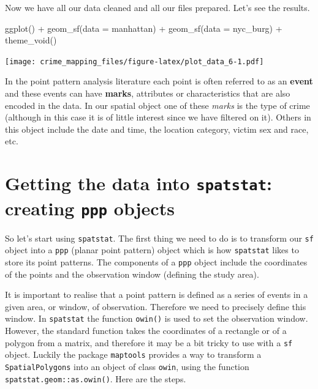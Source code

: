 \documentclass[
  krantz2]{krantz}
\makeatletter
\newenvironment{Shaded}{\begin{snugshade}}{\end{snugshade}}
\newcommand{\AttributeTok}[1]{\textcolor[rgb]{0.61,0.61,0.61}{#1}}
\newcommand{\FunctionTok}[1]{\textcolor[rgb]{0,0,0}{#1}}
\newcommand{\NormalTok}[1]{#1}
\newcommand{\SpecialCharTok}[1]{\textcolor[rgb]{0,0,0}{#1}}
\newenvironment{kframe}{%
\medskip{}
\setlength{\fboxsep}{.8em}
 \def\at@end@of@kframe{}%
 \ifinner\ifhmode%
  \def\at@end@of@kframe{\end{minipage}}%
  \begin{minipage}{\columnwidth}%
 \fi\fi%
 \def\FrameCommand##1{\hskip\@totalleftmargin \hskip-\fboxsep
 \colorbox{shadecolor}{##1}\hskip-\fboxsep
     \hskip-\linewidth \hskip-\@totalleftmargin \hskip\columnwidth}%
 \MakeFramed {\advance\hsize-\width
   \@totalleftmargin\z@ \linewidth\hsize
   \@setminipage}}%
 {\par\unskip\endMakeFramed%
 \at@end@of@kframe}
\renewenvironment{Shaded}{\begin{kframe}}{\end{kframe}}
\makeatother
\begin{document}
Now we have all our data cleaned and all our files prepared. Let's see the results.

\begin{Shaded}
\begin{Highlighting}[]
\FunctionTok{ggplot}\NormalTok{() }\SpecialCharTok{+} 
  \FunctionTok{geom\_sf}\NormalTok{(}\AttributeTok{data =}\NormalTok{ manhattan) }\SpecialCharTok{+} 
  \FunctionTok{geom\_sf}\NormalTok{(}\AttributeTok{data =}\NormalTok{ nyc\_burg) }\SpecialCharTok{+} 
  \FunctionTok{theme\_void}\NormalTok{()}
\end{Highlighting}
\end{Shaded}

\texttt{[image: crime\_mapping\_files/figure-latex/plot\_data\_6-1.pdf]}

In the point pattern analysis literature each point is often referred to as an \textbf{event} and these events can have \textbf{marks}, attributes or characteristics that are also encoded in the data. In our spatial object one of these \emph{marks} is the type of crime (although in this case it is of little interest since we have filtered on it). Others in this object include the date and time, the location category, victim sex and race, etc.

\hypertarget{getting-the-data-into-spatstat-creating-ppp-objects}{%
\section{\texorpdfstring{Getting the data into \texttt{spatstat}: creating \texttt{ppp} objects}{Getting the data into spatstat: creating ppp objects}}\label{getting-the-data-into-spatstat-creating-ppp-objects}}

So let's start using \texttt{spatstat}. The first thing we need to do is to transform our \texttt{sf} object into a \texttt{ppp} (planar point pattern) object which is how \texttt{spatstat} likes to store its point patterns. The components of a \texttt{ppp} object include the coordinates of the points and the observation window (defining the study area).

It is important to realise that a point pattern is defined as a series of events in a given area, or window, of observation. Therefore we need to precisely define this window. In \texttt{spatstat} the function \texttt{owin()} is used to set the observation window. However, the standard function takes the coordinates of a rectangle or of a polygon from a matrix, and therefore it may be a bit tricky to use with a \texttt{sf} object. Luckily the package \texttt{maptools} provides a way to transform a \texttt{SpatialPolygons} into an object of class \texttt{owin}, using the function \texttt{spatstat.geom::as.owin()}. Here are the steps.
\end{document}
